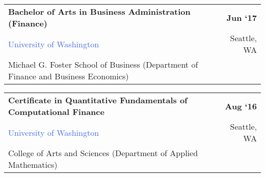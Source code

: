 \documentclass[10pt]{article}
\newcommand{\highlightcolor}{RoyalBlue}
\newcommand{\tabularxwidth}{\textwidth}
\begin{document}
            \vspace{.5em}
        

    
        \begin{tabularx}{\tabularxwidth}{X r}
            \textbf{Bachelor of Arts in Business Administration (Finance)} & \textbf{
    Jun ‘17} \\
            \quad \textcolor{\highlightcolor}{University of Washington} & 
    Seattle, 
        WA \\
            \quad Michael G. Foster School of Business (Department of Finance and Business Economics) & \\
            
            
                
                    
                
            
        \end{tabularx}

        
            \vspace{.5em}
        

    
        \begin{tabularx}{\tabularxwidth}{X r}
            \textbf{Certificate in Quantitative Fundamentals of Computational Finance} & \textbf{
    Aug ‘16} \\
            \quad \textcolor{\highlightcolor}{University of Washington} & 
    Seattle, 
        WA \\
            \quad College of Arts and Sciences (Department of Applied Mathematics) & \\
            
            
        \end{tabularx}

        

    

\end{document}
